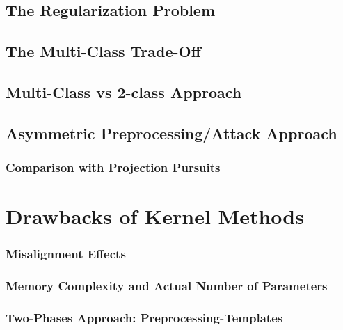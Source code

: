 \subsection{The Regularization Problem}
\subsection{The Multi-Class Trade-Off}
\subsection{Multi-Class vs 2-class Approach}
\subsection{Asymmetric Preprocessing/Attack Approach}
\subsubsection{Comparison with Projection Pursuits}


\section{Drawbacks of Kernel Methods}
\subsubsection{Misalignment Effects}
\subsubsection{Memory Complexity and Actual Number of Parameters}
\subsubsection{Two-Phases Approach: Preprocessing-Templates}
